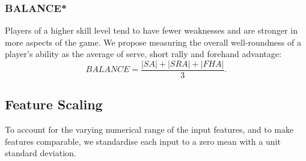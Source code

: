 \subsubsection*{BALANCE*} \label{sec:balance}

Players of a higher skill level tend to have fewer weaknesses and are stronger in more aspects of the game. We propose measuring the overall well-roundness of a player's ability as the average of serve, short rally and forehand advantage:
\begin{equation}
    \textit{BALANCE} = \frac{|\textit{SA}|+|\textit{SRA}|+|\textit{FHA}|}{3}.
\end{equation}



\subsection{Feature Scaling}
To account for the varying numerical range of the input features, and to make features comparable, we standardise each input to a zero mean with a unit standard deviation.

